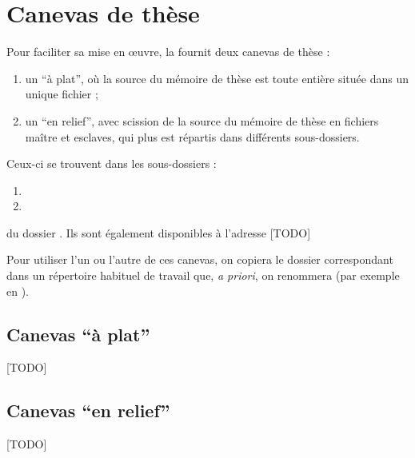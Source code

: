 \chapter{Canevas de thèse}\label{cha:canevas}

Pour faciliter sa mise en œuvre, la \yatcl fournit deux canevas de thèse :
\begin{enumerate}
\item un \enquote{à plat}, où la source  du mémoire de thèse est
  toute entière située dans un unique fichier ;
\item un \enquote{en relief}, avec scission de la source  du mémoire
  de thèse en fichiers maître et esclaves, qui plus est répartis dans
  différents sous-dossiers.
\end{enumerate}
Ceux-ci se trouvent dans les sous-dossiers :
\begin{enumerate}
\item {}
\item {}
\end{enumerate}
du dossier . Ils sont également
disponibles à l'adresse [TODO]

Pour utiliser l'un ou l'autre de ces canevas, on copiera le dossier
correspondant dans un répertoire habituel de travail que, \emph{a
  priori}, on renommera (par exemple en ).

\section{Canevas  \enquote{à plat}}
\label{sec:canevas-a-plat}

[TODO]

\section{Canevas \enquote{en relief}}
\label{sec:canevas-relief}

[TODO]

%
\iffalse
\fi
